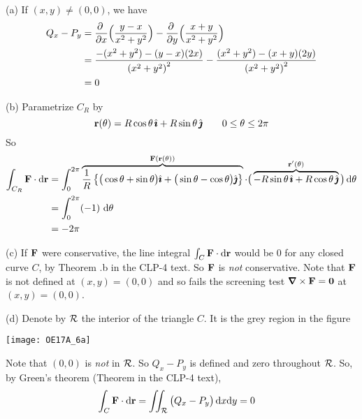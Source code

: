\begin{solution} (a)  If $(x,y)\ne (0,0)$, we have
\begin{align*}
Q_x - P_y
&=\pdiff{}{x}\Big(\frac{y-x}{x^2+y^2}\Big)
-\pdiff{}{y}\Big(\frac{x+y}{x^2+y^2}\Big) \\
&=\frac{-(x^2+y^2)-(y-x)(2x)}{{(x^2+y^2)}^2}
      -\frac{(x^2+y^2)-(x+y)(2y)}{{(x^2+y^2)}^2}\\
&=0
\end{align*}

(b) Parametrize $C_R$ by
\begin{equation*}
\mathbf{r}(\theta) = R\cos\theta\,\hat{\pmb{\imath}} +R\sin\theta\,\hat{\pmb{\jmath}}\qquad
0\le\theta\le 2\pi
\end{equation*}
So
\begin{align*}
\int_{C_R} \mathbf{F} \cdot \mathrm{d}\mathbf{r}
&=\int_0^{2\pi} \overbrace{\frac{1}{R}
   \left\{\big(\cos\theta+\sin\theta\big)\hat{\pmb{\imath}}
           +\big(\sin\theta-\cos\theta\big)\hat{\pmb{\jmath}}\right\}}^{\mathbf{F}(\mathbf{r}(\theta))} 
       \cdot
     \big(\overbrace{-R\sin\theta\,\hat{\pmb{\imath}}+R\cos\theta\,\hat{\pmb{\jmath}}}^{\mathbf{r}'(\theta)}\big)
           \,\mathrm{d}\theta
\\
&=\int_0^{2\pi}(-1)\ \mathrm{d}\theta \\
&=-2\pi
\end{align*}

(c) If $\mathbf{F}$ were conservative, the line integral $\int_C\mathbf{F}\cdot\mathrm{d}\mathbf{r}$
would be $0$ for any closed curve $C$, by 
Theorem .b in the CLP-4 text. 
So $\mathbf{F}$ is \emph{not} conservative. Note that $\mathbf{F}$ is not defined at
$(x,y) = (0,0)$ and so fails the screening
test $\vnabla\times\vF=\vZero$ at $(x,y)=(0,0)$.

(d) Denote by $\mathcal{R}$ the interior of the triangle $C$. It is the grey
region in the figure
\begin{center}
     \texttt{[image: OE17A\_6a]}
\end{center}
Note that $(0,0)$ is \emph{not} in $\mathcal{R}$. So $Q_x - P_y$ is defined
and zero throughout $\mathcal{R}$. So, by Green's theorem  (Theorem  in the CLP-4 text), 
\begin{align*}
\int_C \mathbf{F} \cdot \mathrm{d}\mathbf{r}
&= \iint_{\mathcal{R}}\big(Q_x - P_y\big)\,\mathrm{d}x\mathrm{d}y
=0
\end{align*}


\end{solution}
